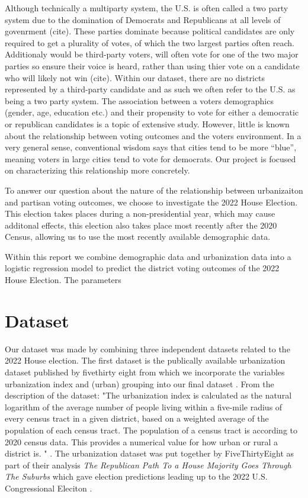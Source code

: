 \documentclass[12pt]{article}
\begin{document}
Although technically a multiparty system, the U.S. is often called a two party system due to the domination of Democrats and Republicans at all levels of govenrment (cite). These parties dominate because political candidates are only required to get a plurality of votes, of which the two largest parties often reach. Additionaly would be third-party voters, will often vote for one of the two major parties so ensure their voice is heard, rather than using thier vote on a candidate who will likely not win (cite). Within our dataset, there are no districts represented by a third-party candidate and as such we often refer to the U.S. as being a two party system.  The association between a voters demographics (gender, age, education etc.) and their propensity to vote for either a democratic or republican candidates is a topic of extensive study. However, little is known about the relationship between voting outcomes and the voters environment.  In a very general sense, conventional wisdom says that cities tend to be more “blue”, meaning voters in large cities tend to vote for democrats. Our project is focused on characterizing this relationship more concretely.

To answer our question about the nature of the relationship between urbanizaiton and partisan voting outcomes, we choose to investigate the 2022 House Election. This election takes places during a non-presidential year, which may cause additonal effects, this election also takes place most recently after the 2020 Census, allowing us to use the most recently available demographic data.

Within this report we combine demographic data and urbanization data into a logistic regression model to predict the district voting outcomes of the 2022 House Election. The parameters 


\section{Dataset}


Our dataset was made by combining three independent datasets related to the 2022 House election. The first dataset is the publically available urbanization dataset published by fivethirty eight from which we incorporate the variables urbanization index  and (urban) grouping into our final dataset \cite{urbanizationdataset}. From the description of the dataset: "The urbanization index is calculated as the natural logarithm of the average number of people living within a five-mile radius of every census tract in a given district, based on a weighted average of the population of each census tract. The population of a census tract is according to 2020 census data. This provides a numerical value for how urban or rural a district is. " \cite{urbanizationdataset}. The urbanization dataset was put together by FiveThirtyEight as part of their analysis  \textit{The Republican Path To a House Majority Goes Through The Suburbs} which gave election predictions leading up to the 2022 U.S. Congressional Eleciton \cite{538urbanizationarticle}. 
\end{document}
